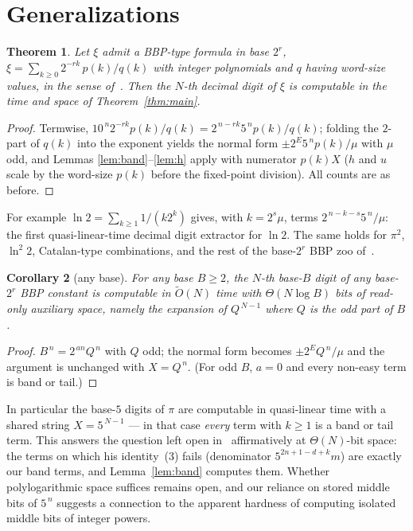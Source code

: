 \documentclass[11pt]{article}
\newtheorem{theorem}{Theorem}
\newtheorem{corollary}[theorem]{Corollary}
\theoremstyle{remark}
\theoremstyle{definition}
\newcommand{\Ot}{\widetilde{O}}
\begin{document}
\section{Generalizations}\label{sec:general}

\begin{theorem}\label{thm:general}
Let $\xi$ admit a BBP-type formula in base $2^{r}$,
$\xi=\sum_{k\ge0}2^{-rk}\,p(k)/q(k)$ with integer polynomials and $q$ having
word-size values, in the sense of~\cite{BBP97}. Then the $N$-th decimal
digit of $\xi$ is computable in the time and space of
Theorem~\ref{thm:main}.
\end{theorem}

\begin{proof}
Termwise, $10^{\,n}2^{-rk}p(k)/q(k)=2^{\,n-rk}5^{\,n}p(k)/q(k)$; folding the
$2$-part of $q(k)$ into the exponent yields the normal form
$\pm2^{E}5^{\,n}p(k)/\mu$ with $\mu$ odd, and Lemmas
\ref{lem:band}--\ref{lem:h} apply with numerator $p(k)X$ ($h$ and $u$ scale
by the word-size $p(k)$ before the fixed-point division). All counts are as
before.
\end{proof}

For example $\ln 2=\sum_{k\ge1}1/(k2^{k})$ gives, with $k=2^{s}\mu$,
terms $2^{\,n-k-s}5^{\,n}/\mu$: the first quasi-linear-time decimal digit
extractor for $\ln 2$. The same holds for $\pi^{2}$, $\ln^{2}2$, Catalan-type
combinations, and the rest of the base-$2^r$ BBP zoo of~\cite{BaileyComp}.

\begin{corollary}[any base]\label{cor:anybase}
For any base $B\ge 2$, the $N$-th base-$B$ digit of any base-$2^{r}$ BBP
constant is computable in $\Ot(N)$ time with $\Theta(N\log B)$ bits of
read-only auxiliary space, namely the expansion of $Q^{\,N-1}$ where $Q$ is
the odd part of $B$.
\end{corollary}

\begin{proof}
$B^{\,n}=2^{\,an}Q^{\,n}$ with $Q$ odd; the normal form becomes
$\pm2^{E}Q^{\,n}/\mu$ and the argument is unchanged with $X=Q^{\,n}$.
(For odd $B$, $a=0$ and every non-easy term is band or tail.)
\end{proof}

In particular the base-$5$ digits of $\pi$ are computable in quasi-linear
time with a shared string $X=5^{\,N-1}$ --- in that case \emph{every} term
with $k\ge1$ is a band or tail term. This answers the question left open
in~\cite{Zudilin24} affirmatively at $\Theta(N)$-bit space: the terms on
which his identity~(3) fails (denominator $5^{2n+1-d+k}m$) are exactly our
band terms, and Lemma~\ref{lem:band} computes them. Whether polylogarithmic
space suffices remains open, and our reliance on stored middle bits of
$5^{\,n}$ suggests a connection to the apparent hardness of computing
isolated middle bits of integer powers.
\end{document}
